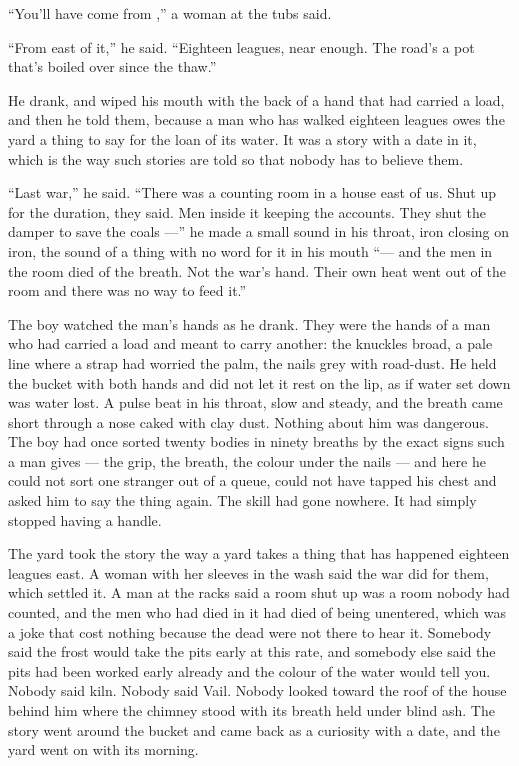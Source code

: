 “You'll have come from ,” a woman at the tubs said.

“From east of it,” he said. “Eighteen leagues, near enough. The road's a pot that's boiled over since the thaw.”

He drank, and wiped his mouth with the back of a hand that had carried a load, and then he told them, because a man who has walked eighteen leagues owes the yard a thing to say for the loan of its water. It was a story with a date in it, which is the way such stories are told so that nobody has to believe them.

“Last war,” he said. “There was a counting room in a house east of us. Shut up for the duration, they said. Men inside it keeping the accounts. They shut the damper to save the coals ---” he made a small sound in his throat, iron closing on iron, the sound of a thing with no word for it in his mouth “--- and the men in the room died of the breath. Not the war's hand. Their own heat went out of the room and there was no way to feed it.”

The boy watched the man's hands as he drank. They were the hands of a man who had carried a load and meant to carry another: the knuckles broad, a pale line where a strap had worried the palm, the nails grey with road-dust. He held the bucket with both hands and did not let it rest on the lip, as if water set down was water lost. A pulse beat in his throat, slow and steady, and the breath came short through a nose caked with clay dust. Nothing about him was dangerous. The boy had once sorted twenty bodies in ninety breaths by the exact signs such a man gives --- the grip, the breath, the colour under the nails --- and here he could not sort one stranger out of a queue, could not have tapped his chest and asked him to say the thing again. The skill had gone nowhere. It had simply stopped having a handle.

The yard took the story the way a yard takes a thing that has happened eighteen leagues east. A woman with her sleeves in the wash said the war did for them, which settled it. A man at the racks said a room shut up was a room nobody had counted, and the men who had died in it had died of being unentered, which was a joke that cost nothing because the dead were not there to hear it. Somebody said the frost would take the pits early at this rate, and somebody else said the pits had been worked early already and the colour of the water would tell you. Nobody said kiln. Nobody said Vail. Nobody looked toward the roof of the house behind him where the chimney stood with its breath held under blind ash. The story went around the bucket and came back as a curiosity with a date, and the yard went on with its morning.


